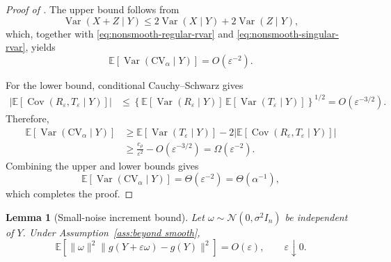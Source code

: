 \documentclass[12pt]{article}
\newtheorem{lemma}{Lemma}[section]
\def\calN{\mathcal{N}}
\newcommand{\ep}{\varepsilon}
\theoremstyle{general}
\newcommand{\cv}{{\mathrm{CV}}}
\begin{document}
\begin{proof}[Proof of ]
The upper bound follows from
\[
\operatorname{Var}(X+Z\mid Y)
\leq
2\operatorname{Var}(X\mid Y)
+
2\operatorname{Var}(Z\mid Y),
\]
which, together with
\eqref{eq:nonsmooth-regular-rvar} and
\eqref{eq:nonsmooth-singular-rvar}, yields
\[
\mathbb E\!\left[
\operatorname{Var}(\cv_\alpha\mid Y)
\right]
=
O(\varepsilon^{-2}).
\]

For the lower bound, conditional Cauchy--Schwarz gives
\begin{align*}
\left|
\mathbb E\!\left[
\operatorname{Cov}
\left(
R_\varepsilon,T_\varepsilon\mid Y
\right)
\right]
\right|
&\leq
\left\{
\mathbb E[
\operatorname{Var}(R_\varepsilon\mid Y)]
\,
\mathbb E[
\operatorname{Var}(T_\varepsilon\mid Y)]
\right\}^{1/2}=
O(\varepsilon^{-3/2}).
\end{align*}
Therefore,
\begin{align*}
\mathbb E\!\left[
\operatorname{Var}(\cv_\alpha\mid Y)
\right]
&\geq
\mathbb E\!\left[
\operatorname{Var}(T_\varepsilon\mid Y)
\right]
-
2\left|
\mathbb E\!\left[
\operatorname{Cov}
\left(
R_\varepsilon,T_\varepsilon\mid Y
\right)
\right]
\right|\\
&\geq
\frac{c_\rho}{\varepsilon^2}
-
O(\varepsilon^{-3/2})
=
\Omega(\varepsilon^{-2}).
\end{align*}
Combining the upper and lower bounds gives
\[
\mathbb E\!\left[
\operatorname{Var}(\cv_\alpha\mid Y)
\right]
=
\Theta(\varepsilon^{-2})
=
\Theta(\alpha^{-1}),
\]
which completes the proof.
\end{proof}

\begin{lemma}[Small-noise increment bound]
\label{lem:small-noise-increment}
Let $\omega\sim \calN(0,\sigma^2 I_n)$ be independent of $Y$.
Under Assumption~\ref{ass:beyond smooth},
\[
\mathbb E\left[
\|\omega\|^2
\|g(Y+\ep\omega)-g(Y)\|^2
\right]
=
O(\ep),
\qquad \ep\downarrow0 .
\]
\end{lemma}
\end{document}
